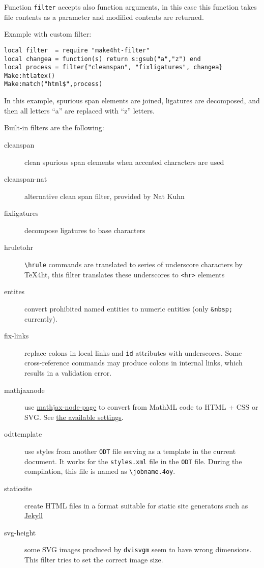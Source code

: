Function \texttt{filter} accepts also function arguments, in this case
this function takes file contents as a parameter and modified contents
are returned.

Example with custom filter:

\begin{verbatim}
local filter  = require "make4ht-filter"
local changea = function(s) return s:gsub("a","z") end
local process = filter{"cleanspan", "fixligatures", changea}
Make:htlatex()
Make:match("html$",process)
\end{verbatim}

In this example, spurious span elements are joined, ligatures are
decomposed, and then all letters ``a'' are replaced with ``z'' letters.

Built-in filters are the following:

\begin{description}
\item[cleanspan]
clean spurious span elements when accented characters are used
\item[cleanspan-nat]
alternative clean span filter, provided by Nat Kuhn
\item[fixligatures]
decompose ligatures to base characters
\item[hruletohr]
\texttt{\textbackslash{}hrule} commands are translated to series of
underscore characters by \TeX4ht, this filter translates these
underscores to \texttt{\textless{}hr\textgreater{}} elements
\item[entites]
convert prohibited named entities to numeric entities (only
\texttt{\&nbsp;} currently).
\item[fix-links]
replace colons in local links and \texttt{id} attributes with
underscores. Some cross-reference commands may produce colons in
internal links, which results in a validation error.
\item[mathjaxnode]
use \href{https://github.com/pkra/mathjax-node-page/}{mathjax-node-page}
to convert from MathML code to HTML + CSS or SVG. See
\protect\hyperlink{mathjaxsettings}{the available settings}.
\item[odttemplate]
use styles from another \texttt{ODT} file serving as a template in the
current document. It works for the \texttt{styles.xml} file in the
\texttt{ODT} file. During the compilation, this file is named as
\texttt{\textbackslash{}jobname.4oy}. \label{sec:odttemplate}
\item[staticsite]
create HTML files in a format suitable for static site generators such
as \href{https://jekyllrb.com/}{Jekyll}
\item[svg-height]
some SVG images produced by \texttt{dvisvgm} seem to have wrong
dimensions. This filter tries to set the correct image size.
\end{description}

